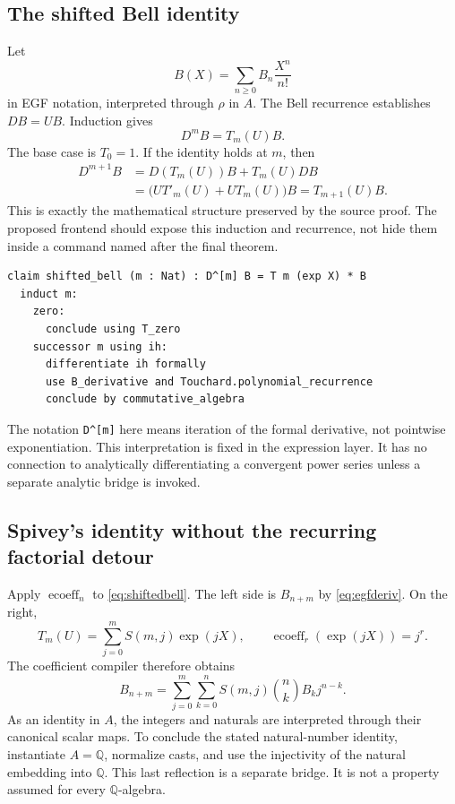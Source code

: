 \documentclass[11pt,a4paper]{article}
\newcommand{\code}[1]{\nolinkurl{#1}}
\newcommand{\Q}{\mathbb Q}
\newcommand{\ecoeff}{\operatorname{ecoeff}}
\theoremstyle{definition}
\begin{document}
\subsection{The shifted Bell identity}
Let
\[
 B(X)=\sum_{n\geq0}B_n\frac{X^n}{n!}
\]
in EGF notation, interpreted through \(\rho\) in \(A\). The Bell recurrence
establishes \(DB=UB\). Induction gives
\begin{equation}\label{eq:shiftedbell}
 D^m B=T_m(U)B.
\end{equation}
The base case is \(T_0=1\). If the identity holds at \(m\), then
\begin{align*}
 D^{m+1}B
 &=D(T_m(U))B+T_m(U)DB\\
 &=\bigl(UT'_m(U)+UT_m(U)\bigr)B
 =T_{m+1}(U)B.
\end{align*}
This is exactly the mathematical structure preserved by the source proof.
The proposed frontend should expose this induction and recurrence, not hide them
inside a command named after the final theorem.

\begin{lstlisting}
claim shifted_bell (m : Nat) : D^[m] B = T m (exp X) * B
  induct m:
    zero:
      conclude using T_zero
    successor m using ih:
      differentiate ih formally
      use B_derivative and Touchard.polynomial_recurrence
      conclude by commutative_algebra
\end{lstlisting}

The notation \code{D^[m]} here means iteration of the formal derivative, not
pointwise exponentiation. This interpretation is fixed in the expression layer.
It has no connection to analytically differentiating a convergent power series
unless a separate analytic bridge is invoked.

\subsection{Spivey's identity without the recurring factorial detour}
Apply \(\ecoeff_n\) to \eqref{eq:shiftedbell}. The left side is \(B_{n+m}\) by
\eqref{eq:egfderiv}. On the right,
\[
 T_m(U)=\sum_{j=0}^{m}S(m,j)\exp(jX),
 \qquad \ecoeff_r(\exp(jX))=j^r.
\]
The coefficient compiler therefore obtains
\begin{equation}\label{eq:spivey}
 B_{n+m}=\sum_{j=0}^{m}\sum_{k=0}^{n}
   S(m,j)\binom nk B_k j^{n-k}.
\end{equation}
As an identity in \(A\), the integers and naturals are interpreted through their
canonical scalar maps. To conclude the stated natural-number identity, instantiate
\(A=\Q\), normalize casts, and use the injectivity of the natural embedding into
\(\Q\). This last reflection is a separate bridge. It is not a property assumed
for every \(\Q\)-algebra.
\end{document}
